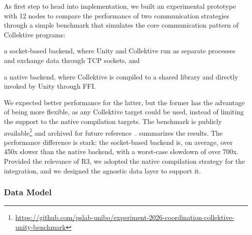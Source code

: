 As first step to head into implementation,
we built an experimental prototype with 12 nodes to compare the performance of two communication strategies
through a simple benchmark that simulates the core communication pattern of Collektive programs:
\begin{inlinelist}
    \item a socket-based backend, where Unity and Collektive run as separate processes and exchange data through TCP sockets, and
    \item a native backend, where Collektive is compiled to a shared library and directly invoked by Unity through \ac{FFI}.
\end{inlinelist}
%
We expected better performance for the latter,
but the former has the advantage of being more flexible,
as any Collektive target could be used,
instead of limiting the support to the native compilation targets.
%
The benchmark is publicly available\footnote{
    \scriptsize
    \url{https://github.com/pslab-unibo/experiment-2026-coordination-collektive-unity-benchmark}
} and archived for future reference~\cite{benchmark-zenodo}.
%
 summarizes the results.
%
The performance difference is stark: the socket-based backend is, on average,
over 450x slower than the native backend,
with a worst-case slowdown of over 700x.
%
Provided the relevance of R3, we adopted the native compilation strategy for the integration,
and we designed the agnostic data layer to support it.

\subsubsection{Data Model}\label{sec:data-model-and-serialization}

